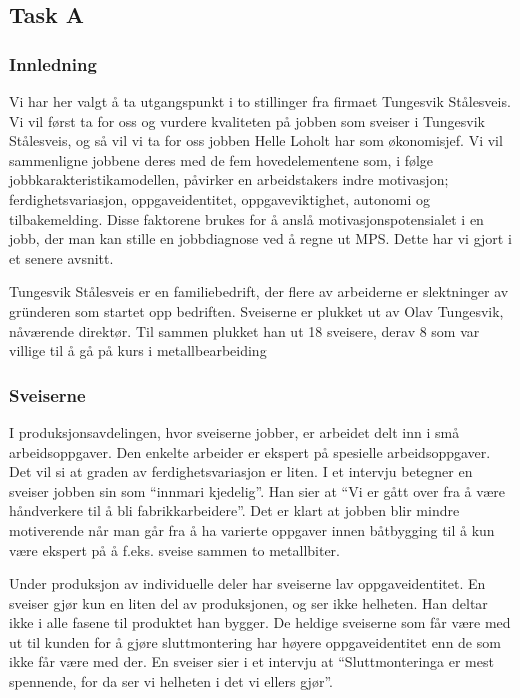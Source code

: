 

\subsection{Task A}
\subsubsection{Innledning}
Vi har her valgt å ta utgangspunkt i to stillinger fra firmaet Tungesvik Stålesveis. Vi vil først ta for oss og vurdere kvaliteten på jobben som sveiser i Tungesvik Stålesveis, og så vil vi ta for oss jobben Helle Loholt har som økonomisjef. Vi vil sammenligne jobbene deres med de fem hovedelementene som, i følge jobbkarakteristikamodellen, påvirker en arbeidstakers indre motivasjon; ferdighetsvariasjon, oppgaveidentitet, oppgaveviktighet, autonomi og tilbakemelding. Disse faktorene brukes for å anslå motivasjonspotensialet i en jobb, der man kan stille en jobbdiagnose ved å regne ut MPS. Dette har vi gjort i et senere avsnitt.

Tungesvik Stålesveis er en familiebedrift, der flere av arbeiderne er slektninger av gründeren som startet opp bedriften. Sveiserne er plukket ut av Olav Tungesvik, nåværende direktør. Til sammen plukket han ut 18 sveisere, derav 8 som var villige til å gå på kurs i metallbearbeiding

\subsubsection{Sveiserne}
I produksjonsavdelingen, hvor sveiserne jobber, er arbeidet delt inn i små arbeidsoppgaver. Den enkelte arbeider er ekspert på spesielle arbeidsoppgaver. Det vil si at graden av ferdighetsvariasjon er liten. I et intervju betegner en sveiser jobben sin som “innmari kjedelig”. Han sier at “Vi er gått over fra å være håndverkere til å bli fabrikkarbeidere”. Det er klart at jobben blir mindre motiverende når man går fra å ha varierte oppgaver innen båtbygging til å kun være ekspert på å f.eks. sveise sammen to metallbiter.

Under produksjon av individuelle deler har sveiserne lav oppgaveidentitet. En sveiser gjør kun en liten del av produksjonen, og ser ikke helheten. Han deltar ikke i alle fasene til produktet han bygger. De heldige sveiserne som får være med ut til kunden for å gjøre sluttmontering har høyere oppgaveidentitet enn de som ikke får være med der. En sveiser sier i et intervju at “Sluttmonteringa er mest spennende, for da ser vi helheten i det vi ellers gjør”.

